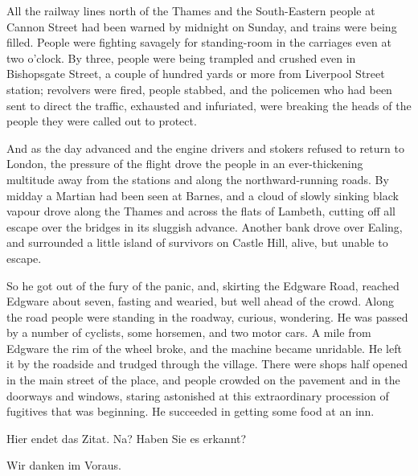 \documentclass[11pt,ngerman,latin9,a4paper]{g-brief-ntz39lg19_exp}
\begin{document}
\begin{g-brief}
All the railway lines north of the Thames and the South-Eastern people at Cannon Street had been warned by midnight on Sunday, and trains were being filled.  People were fighting savagely for standing-room in the carriages even at two o'clock.  By three, people were being trampled and crushed even in Bishopsgate Street, a couple of hundred yards or more from Liverpool Street station; revolvers were fired, people stabbed, and the policemen who had been sent to direct the traffic, exhausted and infuriated, were breaking the heads of the people they were called out to protect.

And as the day advanced and the engine drivers and stokers refused to return to London, the pressure of the flight drove the people in an ever-thickening multitude away from the stations and along the northward-running roads.  By midday a Martian had been seen at Barnes, and a cloud of slowly sinking black vapour drove along the Thames and across the flats of Lambeth, cutting off all escape over the bridges in its sluggish advance.  Another bank drove over Ealing, and surrounded a little island of survivors on Castle Hill, alive, but unable to escape.

So he got out of the fury of the panic, and, skirting the Edgware Road, reached Edgware about seven, fasting and wearied, but well ahead of the crowd.  Along the road people were standing in the roadway, curious, wondering.  He was passed by a number of cyclists, some horsemen, and two motor cars.  A mile from Edgware the rim of the wheel broke, and the machine became unridable.  He left it by the roadside and trudged through the village.  There were shops half opened in the main street of the place, and people crowded on the pavement and in the doorways and windows, staring astonished at this extraordinary procession of fugitives that was beginning.  He succeeded in getting some food at an inn.

Hier endet das Zitat. Na? Haben Sie es erkannt?

Wir danken im Voraus.

\end{g-brief}
\end{document}
